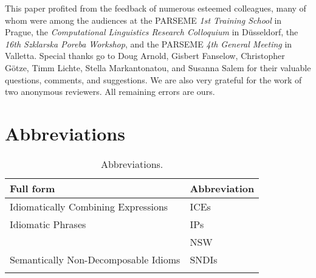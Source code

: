 \documentclass[output=paper]{langsci/langscibook}
\begin{document}
This paper profited from the feedback of numerous esteemed colleagues, many of whom were among the audiences at the PARSEME \emph{1st Training School} in Prague, 
the \emph{Computational Linguistics Research Colloquium} in D\"usseldorf, 
the \emph{16th Szklarska Poreba Workshop}, and the PARSEME \emph{4th General Meeting} in Valletta. Special thanks go to Doug Arnold, Gisbert Fanselow, Christopher G\"otze, Timm Lichte, Stella Markantonatou, and Susanna Salem for their valuable questions, comments, and suggestions. We are also very grateful for the work of two anonymous reviewers. All remaining errors are ours.

\section*{Abbreviations}

\begin{table}
\begin{tabular}{ll}
\lsptoprule
Full form  & Abbreviation \\
\midrule
Idiomatically Combining Expressions & ICEs \\
Idiomatic Phrases & IPs\\
\citealt{Nunberg1994} & NSW \\
Semantically Non-Decomposable Idioms & SNDIs\\
\lspbottomrule
\end{tabular}
\caption{Abbreviations.}
\end{table}

{\sloppy
\printbibliography[heading=subbibliography,notkeyword=this]
}
\end{document}
